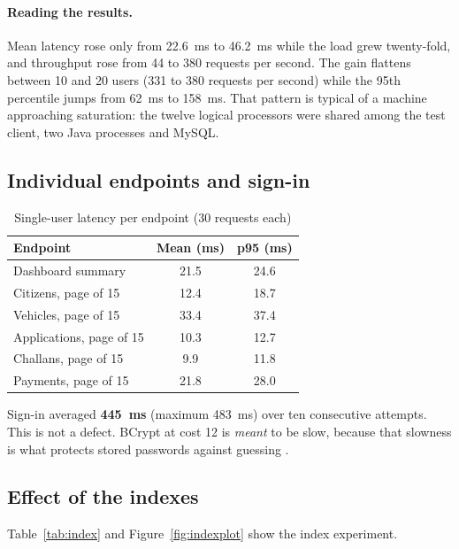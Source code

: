 \paragraph{Reading the results.} Mean latency rose only from 22.6~ms to 46.2~ms while the
load grew twenty-fold, and throughput rose from 44 to 380 requests per second. The gain
flattens between 10 and 20 users (331 to 380 requests per second) while the 95th
percentile jumps from 62~ms to 158~ms. That pattern is typical of a machine approaching
saturation: the twelve logical processors were shared among the test client, two Java
processes and MySQL.

\subsection{Individual endpoints and sign-in}
\begin{table}[H]
\centering\small
\caption{Single-user latency per endpoint (30 requests each)}\label{tab:endpoints}
\begin{tabularx}{\linewidth}{@{}Xcc@{}}
\toprule \textbf{Endpoint} & \textbf{Mean (ms)} & \textbf{p95 (ms)}\\ \midrule
Dashboard summary & 21.5 & 24.6\\
Citizens, page of 15 & 12.4 & 18.7\\
Vehicles, page of 15 & 33.4 & 37.4\\
Applications, page of 15 & 10.3 & 12.7\\
Challans, page of 15 & 9.9 & 11.8\\
Payments, page of 15 & 21.8 & 28.0\\
\bottomrule
\end{tabularx}
\end{table}
Sign-in averaged \textbf{445~ms} (maximum 483~ms) over ten consecutive attempts. This is
not a defect. BCrypt at cost 12 is \emph{meant} to be slow, because that slowness is what
protects stored passwords against guessing \cite{provos1999,owasp-pw}.

\subsection{Effect of the indexes}\label{sec:indexres}
Table~\ref{tab:index} and Figure~\ref{fig:indexplot} show the index experiment.

